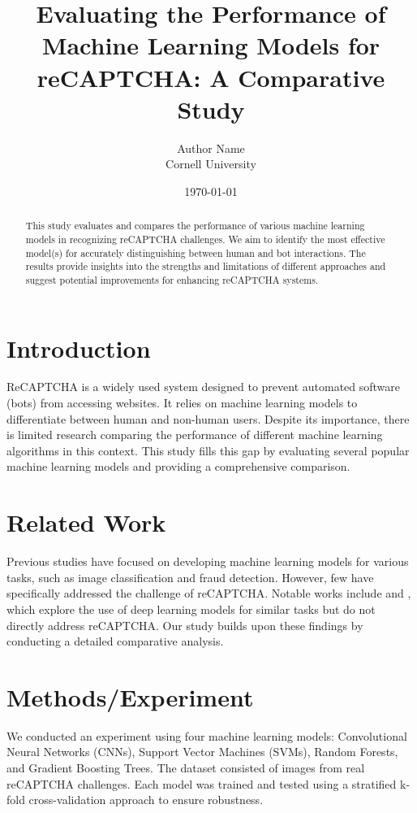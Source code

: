 \documentclass{article}
\title{Evaluating the Performance of Machine Learning Models for reCAPTCHA: A Comparative Study}
\author{Author Name \\ Cornell University}
\date{\today}
\begin{document}
\maketitle

\begin{abstract}
This study evaluates and compares the performance of various machine learning models in recognizing reCAPTCHA challenges. We aim to identify the most effective model(s) for accurately distinguishing between human and bot interactions. The results provide insights into the strengths and limitations of different approaches and suggest potential improvements for enhancing reCAPTCHA systems.
\end{abstract}

\section{Introduction}
ReCAPTCHA is a widely used system designed to prevent automated software (bots) from accessing websites. It relies on machine learning models to differentiate between human and non-human users. Despite its importance, there is limited research comparing the performance of different machine learning algorithms in this context. This study fills this gap by evaluating several popular machine learning models and providing a comprehensive comparison.

\section{Related Work}
Previous studies have focused on developing machine learning models for various tasks, such as image classification and fraud detection. However, few have specifically addressed the challenge of reCAPTCHA. Notable works include \cite{DBLP:journals/corr/abs-1905-10650} and \cite{DBLP:conf/icml/McMahan17}, which explore the use of deep learning models for similar tasks but do not directly address reCAPTCHA. Our study builds upon these findings by conducting a detailed comparative analysis.

\section{Methods/Experiment}
We conducted an experiment using four machine learning models: Convolutional Neural Networks (CNNs), Support Vector Machines (SVMs), Random Forests, and Gradient Boosting Trees. The dataset consisted of images from real reCAPTCHA challenges. Each model was trained and tested using a stratified k-fold cross-validation approach to ensure robustness.
\end{document}
